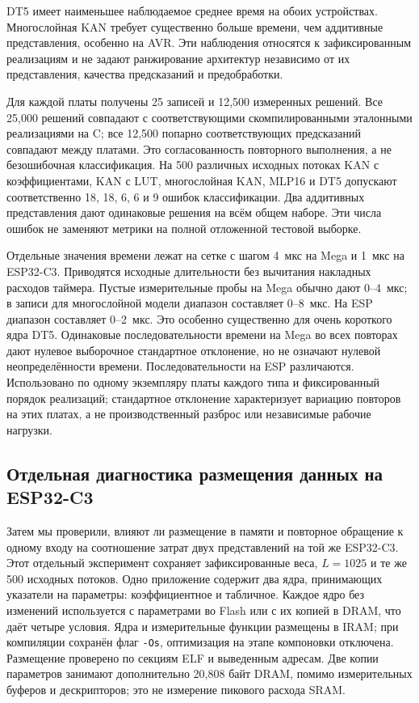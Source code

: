 DT5 имеет наименьшее наблюдаемое среднее время на обоих устройствах. Многослойная KAN требует существенно больше времени, чем аддитивные представления, особенно на AVR. Эти наблюдения относятся к зафиксированным реализациям и не задают ранжирование архитектур независимо от их представления, качества предсказаний и предобработки.

Для каждой платы получены 25 записей и 12,500 измеренных решений. Все 25,000 решений совпадают с соответствующими скомпилированными эталонными реализациями на C; все 12,500 попарно соответствующих предсказаний совпадают между платами. Это согласованность повторного выполнения, а не безошибочная классификация. На 500 различных исходных потоках KAN с коэффициентами, KAN с LUT, многослойная KAN, MLP16 и DT5 допускают соответственно 18, 18, 6, 6 и 9 ошибок классификации. Два аддитивных представления дают одинаковые решения на всём общем наборе. Эти числа ошибок не заменяют метрики на полной отложенной тестовой выборке.

Отдельные значения времени лежат на сетке с шагом 4~мкс на Mega и 1~мкс на ESP32-C3. Приводятся исходные длительности без вычитания накладных расходов таймера. Пустые измерительные пробы на Mega обычно дают 0--4~мкс; в записи для многослойной модели диапазон составляет 0--8~мкс. На ESP диапазон составляет 0--2~мкс. Это особенно существенно для очень короткого ядра DT5. Одинаковые последовательности времени на Mega во всех повторах дают нулевое выборочное стандартное отклонение, но не означают нулевой неопределённости времени. Последовательности на ESP различаются. Использовано по одному экземпляру платы каждого типа и фиксированный порядок реализаций; стандартное отклонение характеризует вариацию повторов на этих платах, а не производственный разброс или независимые рабочие нагрузки.

\subsection{Отдельная диагностика размещения данных на ESP32-C3}
\label{sec:c3diagnostic}
Затем мы проверили, влияют ли размещение в памяти и повторное обращение к одному входу на соотношение затрат двух представлений на той же ESP32-C3. Этот отдельный эксперимент сохраняет зафиксированные веса, $L=1025$ и те же 500 исходных потоков. Одно приложение содержит два ядра, принимающих указатели на параметры: коэффициентное и табличное. Каждое ядро без изменений используется с параметрами во Flash или с их копией в DRAM, что даёт четыре условия. Ядра и измерительные функции размещены в IRAM; при компиляции сохранён флаг \texttt{-Os}, оптимизация на этапе компоновки отключена. Размещение проверено по секциям ELF и выведенным адресам. Две копии параметров занимают дополнительно 20,808 байт DRAM, помимо измерительных буферов и дескрипторов; это не измерение пикового расхода SRAM.

